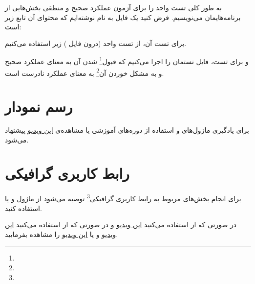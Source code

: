 به طور کلی تست واحد را برای آزمون عملکرد صحیح و منطقی بخش‌هایی از برنامه‌هایمان می‌نویسیم. فرض کنید یک فایل به نام  نوشته‌ایم که محتوای آن تابع زیر است:



برای تست آن، از تست واحد (درون فایل ) زیر استفاده می‌کنیم.


و برای تست، فایل تستمان را اجرا می‌کنیم
که قبول\footnote{} شدن آن به معنای عملکرد صحیح و به مشکل خوردن آن\footnote{} به معنای عملکرد نادرست است.


\section{رسم نمودار}

برای یادگیری ماژول‌های  و  استفاده از دوره‌های آموزشی \href{https://www.kaggle.com}{\underline{}} یا مشاهده‌‌ی \href{https://www.youtube.com/watch?v=LnGz20B3nTU}{\underline{این ویدیو}} پیشنهاد می‌شود.

\section{رابط کاربری گرافیکی}

برای انجام بخش‌های مربوط به رابط کاربری گرافیکی\footnote{} توصیه می‌شود از ماژول  و یا  استفاده کنید.

در صورتی که از  استفاده می‌کنید \href{https://www.youtube.com/watch?v=ibf5cx221hk}{\underline{این ویدیو}} و در صورتی که از  استفاده می‌کنید \href{https://www.youtube.com/watch?v=MOItX2aKTGc}{\underline{این ویدیو}} و یا \href{https://www.youtube.com/watch?v=hX8fj8SGZJs}{\underline{این ویدیو}} را مشاهده بفرمایید.